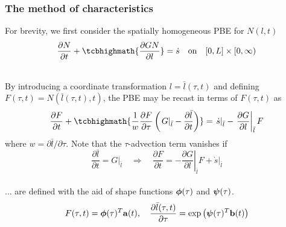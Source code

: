 \documentclass[10pt,xcolor=dvipsnames]{beamer}
\begin{document}

\begin{frame}[t]

  \frametitle{The method of characteristics}
  
    
  For brevity, we first consider the spatially homogeneous PBE for $N(l, t)$
  \begin{equation*}
    \frac{\partial N}{\partial t} + \tcbhighmath{\frac{\partial G N}{\partial l}} = \dot{s} \quad\text{on}\quad [0, L] \times [0, \infty)
  \end{equation*}

  \\
  \justifying By introducing a coordinate transformation $l = \bar{l}(\tau, t)$ and defining $F(\tau, t) = N(\bar{l}(\tau, t), t)$, the PBE may be recast in terms of $F(\tau, t)$ as
  \begin{equation*}
  \begin{split}
    \frac{\partial F}{\partial t}
    + \tcbhighmath{\frac{1}{w} \frac{\partial F}{\partial\tau} 
    \left(\left.G\right|_{\bar{l}} - \frac{\partial\bar{l}}{\partial t}\right)}
    = \left.\dot{s}\right|_{\bar{l}} - \left.\frac{\partial G}{\partial l}\right|_{\bar{l}} F
  \label{eq:pbe:F}
  \end{split}
  \end{equation*}
  where $w = \partial\bar{l}/\partial\tau$. Note that the $\tau$-advection term vanishes if
  \begin{equation*}
    \frac{\partial\bar{l}}{\partial t} = \left.G\right|_{\bar{l}} \quad\Rightarrow\quad \frac{\partial F}{\partial t} =
    -\left.\frac{\partial G}{\partial l}\right|_{\bar{l}} F + \left.\dot{s}\right|_{\bar{l}}
  \label{eq:pbepod}
  \end{equation*}
  \justifying{}\\
  ... are defined with the aid of shape functions ${\boldsymbol \phi}(\tau)$ and ${\boldsymbol \psi}(\tau)$.
  \begin{equation*}
    F(\tau, t) = {\boldsymbol \phi}(\tau)^T {\mathbf a}(t), \quad
    \frac{\partial\bar{l}(\tau, t)}{\partial\tau} = \exp\left({\boldsymbol \psi}(\tau)^T{\mathbf b}(t)\right)
  \label{eq:discrete}
  \end{equation*}

\end{frame}
\end{document}
